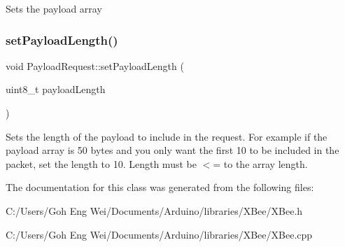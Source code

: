 Sets the payload array \hypertarget{class_payload_request_a6e86a663ab6299afaa1cf21ad7c2c5c1}{}\label{class_payload_request_a6e86a663ab6299afaa1cf21ad7c2c5c1} 
\subsubsection{\texorpdfstring{set\+Payload\+Length()}{setPayloadLength()}}
{\footnotesize\ttfamily void Payload\+Request\+::set\+Payload\+Length (\begin{DoxyParamCaption}\item[{uint8\+\_\+t}]{payload\+Length }\end{DoxyParamCaption})}

Sets the length of the payload to include in the request. For example if the payload array is 50 bytes and you only want the first 10 to be included in the packet, set the length to 10. Length must be $<$= to the array length. 

The documentation for this class was generated from the following files\+:\begin{DoxyCompactItemize}
\item 
C\+:/\+Users/\+Goh Eng Wei/\+Documents/\+Arduino/libraries/\+X\+Bee/X\+Bee.\+h\item 
C\+:/\+Users/\+Goh Eng Wei/\+Documents/\+Arduino/libraries/\+X\+Bee/X\+Bee.\+cpp\end{DoxyCompactItemize}
